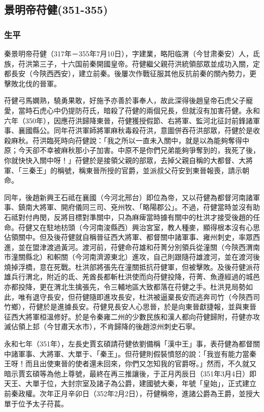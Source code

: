 
\subsection{景明帝苻健\tiny(351-355)}

\subsubsection{生平}

秦景明帝苻健（317年－355年7月10日），字建業，略阳临渭（今甘肃秦安）人，氐族，苻洪第三子，十六国前秦開國皇帝。苻健繼父親苻洪統領部眾並成功入關，定都長安（今陝西西安），建立前秦。後屢次作戰征服其他反抗前秦的關內勢力，更擊敗北伐的晉軍。

苻健弓馬嫻熟，驍勇果敢，好施予亦善於事奉人，故此深得後趙皇帝石虎父子寵愛，當時石虎心中仍提防苻氏，暗殺了苻健的兩個兄長，但就沒有加害苻健。永和六年（350年），因應苻洪歸降東晉，苻健獲授假節、右將軍、監河北征討前鋒諸軍事、襄國縣公。同年苻洪軍師將軍麻秋毒殺苻洪，意圖併吞苻洪部眾，苻健於是收殺麻秋。苻洪臨死時向苻健說：「我之所以一直未入關中，就是以為能夠奪得中原；今天卻不幸被麻秋那小子加害。中原不是你們兄弟能夠爭奪到的，我死了後，你就快快入關中呀！」苻健於是接領父親的部眾，去掉父親自稱的大都督、大將軍、「三秦王」的稱號，稱東晉所授的官爵，並派叔父苻安到東晉報喪，請示朝命。

同年，後趙新興王石祗在襄國（今河北邢台）即位為帝，又以苻健為都督河南諸軍事、鎮南大將軍、開府儀同三司、兗州牧、「略陽郡公」。不過，苻健當時並沒有助石祗對付冉閔，反將目標對準關中，只為麻痺當時據有關中的杜洪才接受後趙的任命。苻健又在駐地枋頭（今河南浚縣西）興治宮室，教人種麥，顯得根本沒有心思佔領關中。但及後苻健就自稱晉征西大將軍、都督關中諸軍事、雍州刺史，率眾西進，並在盟津渡過黃河。渡河前，苻健命苻雄和苻菁分別領兵從潼關（今陝西渭南市潼關縣北）和軹關（今河南濟源東北）進攻，自己則跟隨苻雄渡河，並在渡河後燒掉浮橋，意在死戰。杜洪部將張先在潼關抵抗苻健軍，但被擊敗。及後苻健派苻雄兵行渭北，附近的氐、羌酋長都斬杜洪使而向苻健投降，苻菁、魚遵經過的城邑亦都投降，更在渭北生擒張先，令三輔地區大致都落在苻健之手。杜洪見局勢如此，唯有退守長安，但苻健隨即進攻長安，杜洪被逼棄長安而逃奔司竹（今陝西司竹鄉），苻健於是進據長安。苻健見長安人心思晉，於是向東晉獻捷報，並與東晉征西大將軍桓溫修好。於是令秦雍二州的少數民族和漢人都向苻健歸附，苻健亦攻滅佔領上邽（今甘肅天水市），不肯歸降的後趙涼州刺史石寧。

永和七年（351年），左長史賈玄碩請苻健依劉備稱「漢中王」事，表苻健為都督關中諸軍事、大將軍、大單于、「秦王」。但苻健則假裝憤怒的說：「我豈有能力當秦王呀！而且出使東晉的使者還未回來，你們又怎知我的官爵呀。」然而，不久就又暗示賈玄碩等為他上尊號，最終在再三推讓後，于正月丙辰日（351年3月4日）即天王、大單于位，大封宗室及諸子為公爵，建國號大秦，年號「皇始」，正式建立前秦政權。次年正月辛卯日（352年2月2日），苻健稱帝，進諸公爵為王爵，並授大單于位予太子苻萇。

